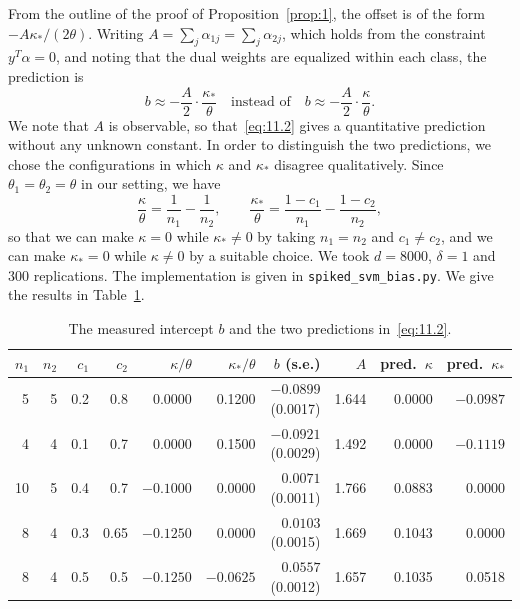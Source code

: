 From the outline of the proof of Proposition~\ref{prop:1}, the offset is of the
form $-A\kappa_*/(2\theta)$. Writing $A=\sum_j\alpha_{1j}=\sum_j\alpha_{2j}$,
which holds from the constraint $y^T\alpha=0$, and noting that the dual weights are
equalized within each class, the prediction is
\begin{equation}
b\approx -\frac{A}{2}\cdot\frac{\kappa_*}{\theta}
\quad\text{instead of}\quad
b\approx -\frac{A}{2}\cdot\frac{\kappa}{\theta}.
\label{eq:11.2}
\end{equation}
We note that $A$ is observable, so that~\eqref{eq:11.2} gives a quantitative
prediction without any unknown constant. In order to distinguish the two
predictions, we chose the configurations in which $\kappa$ and $\kappa_*$ disagree
qualitatively. Since $\theta_1=\theta_2=\theta$ in our setting, we have
\[
\frac{\kappa}{\theta}=\frac{1}{n_1}-\frac{1}{n_2},
\qquad
\frac{\kappa_*}{\theta}=\frac{1-c_1}{n_1}-\frac{1-c_2}{n_2},
\]
so that we can make $\kappa=0$ while $\kappa_*\neq 0$ by taking $n_1=n_2$ and
$c_1\neq c_2$, and we can make $\kappa_*=0$ while $\kappa\neq 0$ by a suitable
choice. We took $d=8000$, $\delta=1$ and $300$ replications. The implementation
is given in \texttt{spiked\_svm\_bias.py}. We give the results
in Table~\ref{tab:bias}.

\begin{table}[ht]
\centering
\caption{The measured intercept $b$ and the two predictions in~\eqref{eq:11.2}.}
\label{tab:bias}
\setlength{\tabcolsep}{3pt}
\begin{tabular}{@{}rrrrrrrrrr@{}}
\toprule
$n_1$ & $n_2$ & $c_1$ & $c_2$ & $\kappa/\theta$ & $\kappa_*/\theta$
  & $b$ (s.e.) & $A$ & pred.\ $\kappa$ & pred.\ $\kappa_*$ \\
\midrule
5 & 5 & 0.2 & 0.8 & 0.0000 & 0.1200 & $-0.0899$ (0.0017) & 1.644 & 0.0000 & $-0.0987$ \\
4 & 4 & 0.1 & 0.7 & 0.0000 & 0.1500 & $-0.0921$ (0.0029) & 1.492 & 0.0000 & $-0.1119$ \\
10 & 5 & 0.4 & 0.7 & $-0.1000$ & 0.0000 & $0.0071$ (0.0011) & 1.766 & 0.0883 & 0.0000 \\
8 & 4 & 0.3 & 0.65 & $-0.1250$ & 0.0000 & $0.0103$ (0.0015) & 1.669 & 0.1043 & 0.0000 \\
8 & 4 & 0.5 & 0.5 & $-0.1250$ & $-0.0625$ & $0.0557$ (0.0012) & 1.657 & 0.1035 & 0.0518 \\
\bottomrule
\end{tabular}
\end{table}

